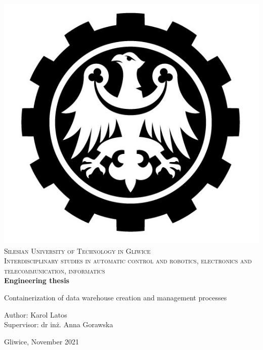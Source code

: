 \newpage \vspace{-5cm}
\thispagestyle{empty}


\begin{onehalfspacing}
\begin{center}

\centering
\includegraphics[keepaspectratio, scale=0.5]{./figures/polsl_eng_notext.jpg} \\[.8cm]

{\fontsize{17.28}{16}\selectfont
\textsc{Silesian University of Technology in Gliwice\\[.3cm]
Interdisciplinary studies in automatic control and robotics, electronics and telecommunication, informatics \\[2.5cm]}
\textbf{Engineering thesis}\\[1.7cm]}

\large{Containerization of data warehouse creation and management processes} \\[2.4cm]

\large
\begin{flushleft}
Author: Karol Latos  \\
Supervisor: dr inż. Anna Gorawska \\
\end{flushleft}

\vspace{2.3cm}
Gliwice, November 2021
\end{center}
\end{onehalfspacing}


\newpage
\thispagestyle{empty}
\mbox{}
\clearpage

\setcounter{page}{0}
\tableofcontents

\pagestyle{fancy}
